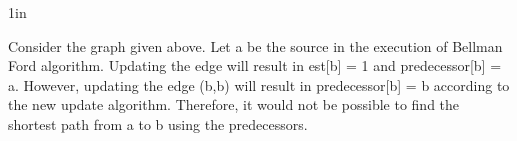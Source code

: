 \begin{prob}
\begin{subprobset}
\begin{subprob}
\begin{responsebox}{1in}
\begin{center}
            	     \end{center}
    		     Consider the graph given above. Let a be the source in the execution of Bellman Ford algorithm.
    		     Updating the edge will result in est[b] = 1 and predecessor[b] = a.
    		     However, updating the edge (b,b) will result in predecessor[b] = b according to the new update algorithm.
    		     Therefore, it would not be possible to find the shortest path from a to b using the predecessors.
    		\end{responsebox}
	    \end{subprob}
	\end{subprobset}
\end{prob}

